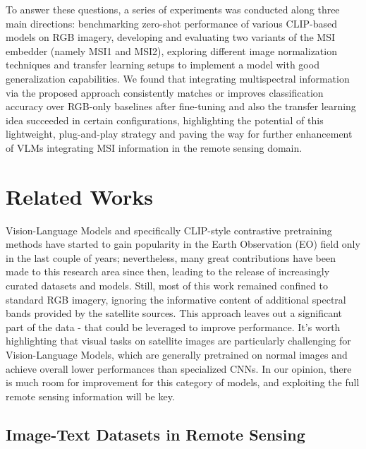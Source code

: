 \documentclass[a4paper, twoside, english]{sapthesis} %
\begin{document}
To answer these questions, a series of experiments was conducted along three main directions: benchmarking zero-shot performance of various CLIP-based models on RGB imagery, developing and evaluating two variants of the MSI embedder (namely MSI1 and MSI2), exploring different image normalization techniques and transfer learning setups to implement a model with good generalization capabilities. We found that integrating multispectral information via the proposed approach consistently matches or improves classification accuracy over RGB-only baselines after fine-tuning and also the transfer learning idea succeeded in certain configurations, highlighting the potential of this lightweight, plug-and-play strategy and paving the way for further enhancement of VLMs integrating MSI information in the remote sensing domain.

\chapter{Related Works} %

Vision-Language Models and specifically CLIP-style contrastive pretraining methods have started to gain popularity in the Earth Observation (EO) field only in the last couple of years; nevertheless, many great contributions have been made to this research area since then, leading to the release of increasingly curated datasets and models. Still, most of this work remained confined to standard RGB imagery, ignoring the informative content of additional spectral bands provided by the satellite sources. This approach leaves out a significant part of the data - that could be leveraged to improve performance. It's worth highlighting that visual tasks on satellite images are particularly challenging for Vision-Language Models, which are generally pretrained on normal images and achieve overall lower performances than specialized CNNs. In our opinion, there is much room for improvement for this category of models, and exploiting the full remote sensing information will be key.

\section{Image-Text Datasets in Remote Sensing}
\end{document}
